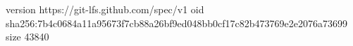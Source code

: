 version https://git-lfs.github.com/spec/v1
oid sha256:7b4c0684a11a95673f7cb88a26bf9ed048bb0cf17c82b473769e2e2076a73699
size 43840
